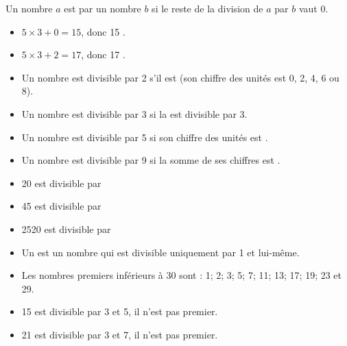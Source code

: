 \begin{myprop}
	Un nombre $a$ est \hspace*{3cm}par un nombre $b$ si le reste de la division de $a$ par $b$ vaut 0. 
\end{myprop}

\begin{myexs}
	\begin{itemize}
		\item $ 5 \times 3 + 0 = 15$, donc 15 \hspace*{5cm}.
		\item $ 5 \times 3 + 2 = 17$, donc 17 \hspace*{5cm}.
	\end{itemize}
\end{myexs}

\begin{myprops}
	\begin{itemize}
		\item Un nombre est divisible par 2 s'il est \hspace*{2cm} (son chiffre des unités est 0, 2, 4, 6 ou 8).
		\item Un nombre est divisible par 3 si la \hspace*{6cm} est divisible par 3.
		\item Un nombre est divisible par 5 si son chiffre des unités est \hspace*{2cm}.
		\item Un nombre est divisible par 9 si la somme de ses chiffres est \hspace*{3cm}. 
	\end{itemize}
\end{myprops}

\begin{myexs}
	\begin{itemize}
		\item 20 est divisible par %
		\item 45 est divisible par %
		\item 2520 est divisible par %
	\end{itemize}
\end{myexs}

\begin{myprops}
	\begin{itemize}
		\item Un \hspace*{5cm} est un nombre qui est divisible uniquement par 1 et lui-même.	
		
		\item Les nombres premiers inférieurs à 30 sont : 1; 2; 3; 5; 7; 11; 13; 17; 19; 23 et 29. 
	\end{itemize}
	
\end{myprops}

\begin{myexs}
	\begin{itemize}
		\item 15 est divisible par 3 et 5, il n'est pas premier.
		\item 21 est divisible par 3 et 7, il n'est pas premier.
	\end{itemize}
\end{myexs}